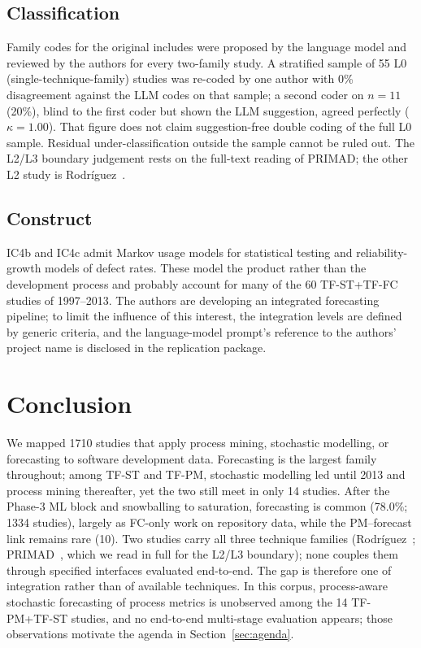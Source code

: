 \documentclass[preprint,12pt,authoryear=false]{elsarticle}
\newcommand{\PM}{TF-PM}
\newcommand{\ST}{TF-ST}
\newcommand{\FC}{TF-FC}
\begin{document}
\subsection{Classification}

Family codes for the original includes were proposed by the language model and reviewed by the authors for every two-family study. A stratified sample of 55 L0 (single-technique-family) studies was re-coded by one author with 0\% disagreement against the LLM codes on that sample; a second coder on $n = 11$ (20\%), blind to the first coder but shown the LLM suggestion, agreed perfectly ($\kappa = 1.00$). That figure does not claim suggestion-free double coding of the full L0 sample. Residual under-classification outside the sample cannot be ruled out. The L2/L3 boundary judgement rests on the full-text reading of PRIMAD; the other L2 study is Rodr{\'i}guez~\cite{rodriguez2017}.

\subsection{Construct}

IC4b and IC4c admit Markov usage models for statistical testing and reliability-growth models of defect rates. These model the product rather than the development process and probably account for many of the 60 \ST{}+\FC{} studies of 1997--2013. The authors are developing an integrated forecasting pipeline; to limit the influence of this interest, the integration levels are defined by generic criteria, and the language-model prompt's reference to the authors' project name is disclosed in the replication package.

\section{Conclusion}\label{sec:conclusion}

We mapped 1710 studies that apply process mining, stochastic modelling, or forecasting to software development data. Forecasting is the largest family throughout; among \ST{} and \PM{}, stochastic modelling led until 2013 and process mining thereafter, yet the two still meet in only 14 studies. After the Phase-3 ML block and snowballing to saturation, forecasting is common (78.0\%; 1334 studies), largely as FC-only work on repository data, while the PM--forecast link remains rare (10). Two studies carry all three technique families (Rodr{\'i}guez~\cite{rodriguez2017}; PRIMAD~\cite{guinea2025}, which we read in full for the L2/L3 boundary); none couples them through specified interfaces evaluated end-to-end. The gap is therefore one of integration rather than of available techniques. In this corpus, process-aware stochastic forecasting of process metrics is unobserved among the 14 \PM{}+\ST{} studies, and no end-to-end multi-stage evaluation appears; those observations motivate the agenda in Section~\ref{sec:agenda}.
\end{document}
